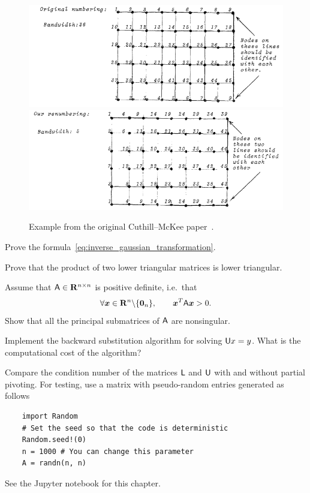 \begin{figure}[ht]
    \centering
    \includegraphics[width=0.49\linewidth]{figures/linear_cuthill-mckee_original.png}
    \includegraphics[width=0.49\linewidth]{figures/linear_cuthill-mckee_improved.png}
    \caption{Example from the original Cuthill--McKee paper~\cite{cuthill1969reducing}.}%
    \label{figure:linear_example_from_cuthill_mckee}
\end{figure}

\begin{exercise}
    \label{exercise:inverse_gaussian_transformation}
    Prove the formula~\eqref{eq:inverse_gaussian_transformation}.
\end{exercise}

\begin{exercise}
    \label{exercise:linear_product_of_lower_triangular}
    Prove that the product of two lower triangular matrices is lower triangular.
\end{exercise}

\begin{exercise}
    \label{exercise:linear_positive_definite_matrix_nonsingular_principal_components}
    Assume that $\mathsf A \in \mathbf R^{n \times n}$ is positive definite,
    i.e.\ that
    \[
        \forall \mathbf{\boldsymbol{x}} \in \mathbf R^n \backslash \{ \mathbf{\boldsymbol{0}}_n \}, \qquad \mathbf{\boldsymbol{x}}^T \mathsf A \mathbf{\boldsymbol{x}} > 0.
    \]
    Show that all the principal submatrices of $\mathsf A$ are nonsingular.
\end{exercise}

\begin{compexercise}
    Implement the backward substitution algorithm for solving $\mathsf U x = y$.
    What is the computational cost of the algorithm?
\end{compexercise}

\begin{compexercise}
    \label{exercise:linear_lu_with_partial_pivoting}
    Compare the condition number of the matrices $\mathsf L$ and $\mathsf U$ with and without partial pivoting.
    For testing, use a matrix with pseudo-random entries generated as follows
    \begin{verbatim}
    import Random
    # Set the seed so that the code is deterministic
    Random.seed!(0)
    n = 1000 # You can change this parameter
    A = randn(n, n)
    \end{verbatim}
\end{compexercise}
\begin{solution}
    See the Jupyter notebook for this chapter.
\end{solution}

